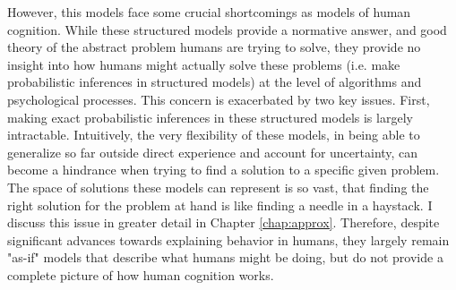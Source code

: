 However, this models face some crucial shortcomings as models of human cognition. While these structured models provide a normative answer, and good theory of the abstract problem humans are trying to solve, they provide no insight into how humans might actually solve these problems (i.e. make probabilistic inferences in structured models) at the level of algorithms and psychological processes. %
This concern is exacerbated by two key issues. First, making exact probabilistic inferences in these structured models is largely intractable. Intuitively, the very flexibility of these models, in being able to generalize so far outside direct experience and account for uncertainty, can become a hindrance when trying to find a solution to a specific given problem. The space of solutions these models can represent is so vast, that finding the right solution for the problem at hand is like finding a needle in a haystack. I discuss this issue in greater detail in Chapter \ref{chap:approx}. Therefore, despite significant advances towards explaining behavior in humans, they largely remain "as-if" models that describe what humans might be doing, but do not provide a complete picture of how human cognition works. 

